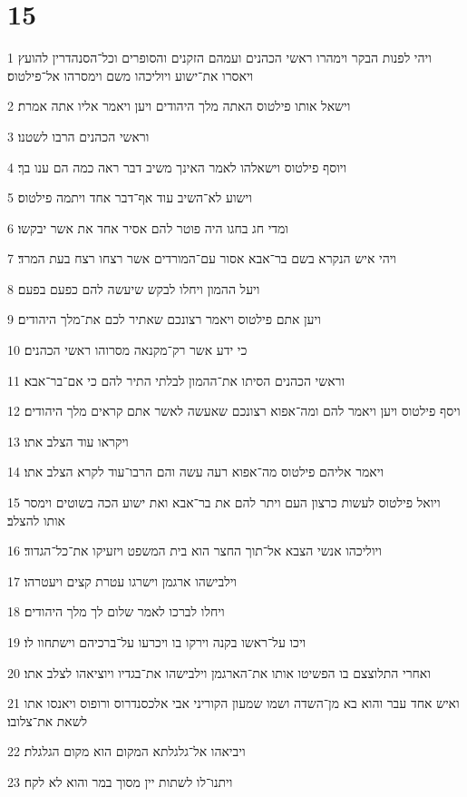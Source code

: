 \chapter{15}

\par 1 ויהי לפנות הבקר וימהרו ראשי הכהנים ועמהם הזקנים והסופרים וכל־הסנהדרין להועץ ויאסרו את־ישוע ויוליכהו משם וימסרהו אל־פילטוס׃
\par 2 וישאל אותו פילטוס האתה מלך היהודים ויען ויאמר אליו אתה אמרת׃
\par 3 וראשי הכהנים הרבו לשטנו׃
\par 4 ויוסף פילטוס וישאלהו לאמר האינך משיב דבר ראה כמה הם ענו בך׃
\par 5 וישוע לא־השיב עוד אף־דבר אחד ויתמה פילטוס׃
\par 6 ומדי חג בחגו היה פוטר להם אסיר אחד את אשר יבקשו׃
\par 7 ויהי איש הנקרא בשם בר־אבא אסור עם־המורדים אשר רצחו רצח בעת המרד׃
\par 8 ויעל ההמון ויחלו לבקש שיעשה להם כפעם בפעם׃
\par 9 ויען אתם פילטוס ויאמר רצונכם שאתיר לכם את־מלך היהודים׃
\par 10 כי ידע אשר רק־מקנאה מסרוהו ראשי הכהנים׃
\par 11 וראשי הכהנים הסיתו את־ההמון לבלתי התיר להם כי אם־בר־אבא׃
\par 12 ויסף פילטוס ויען ויאמר להם ומה־אפוא רצונכם שאעשה לאשר אתם קראים מלך היהודים׃
\par 13 ויקראו עוד הצלב אתו׃
\par 14 ויאמר אליהם פילטוס מה־אפוא רעה עשה והם הרבו־עוד לקרא הצלב אתו׃
\par 15 ויואל פילטוס לעשות כרצון העם ויתר להם את בר־אבא ואת ישוע הכה בשוטים וימסר אותו להצלב׃
\par 16 ויוליכהו אנשי הצבא אל־תוך החצר הוא בית המשפט ויזעיקו את־כל־הגדוד׃
\par 17 וילבישהו ארגמן וישרגו עטרת קצים ויעטרהו׃
\par 18 ויחלו לברכו לאמר שלום לך מלך היהודים׃
\par 19 ויכו על־ראשו בקנה וירקו בו ויכרעו על־ברכיהם וישתחוו לו׃
\par 20 ואחרי התלוצצם בו הפשיטו אותו את־הארגמן וילבישהו את־בגדיו ויוציאהו לצלב אתו׃
\par 21 ואיש אחד עבר והוא בא מן־השדה ושמו שמעון הקוריני אבי אלכסנדרוס ורופוס ויאנסו אתו לשאת את־צלובו׃
\par 22 ויביאהו אל־גלגלתא המקום הוא מקום הגלגלת׃
\par 23 ויתנו־לו לשתות יין מסוך במר והוא לא לקח׃
